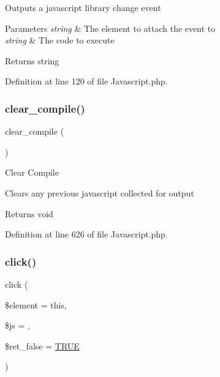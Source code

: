 Outputs a javascript library change event


\begin{DoxyParams}{Parameters}
{\em string} & The element to attach the event to \\
\hline
{\em string} & The code to execute \\
\hline
\end{DoxyParams}
\begin{DoxyReturn}{Returns}
string 
\end{DoxyReturn}


Definition at line 120 of file Javascript.\+php.

\mbox{\label{class_c_i___javascript_a4e3a7e7ffc20e8f578a0d66f52def10d}} 
\subsubsection{\texorpdfstring{clear\_compile()}{clear\_compile()}}
{\footnotesize\ttfamily clear\+\_\+compile (\begin{DoxyParamCaption}{ }\end{DoxyParamCaption})}

Clear Compile

Clears any previous javascript collected for output

\begin{DoxyReturn}{Returns}
void 
\end{DoxyReturn}


Definition at line 626 of file Javascript.\+php.

\mbox{\label{class_c_i___javascript_a508491310edc8bcb766f0adc89ec24c4}} 
\subsubsection{\texorpdfstring{click()}{click()}}
{\footnotesize\ttfamily click (\begin{DoxyParamCaption}\item[{}]{\$element = {\ttfamily \textquotesingle{}this\textquotesingle{}},  }\item[{}]{\$js = {\ttfamily \textquotesingle{}\textquotesingle{}},  }\item[{}]{\$ret\+\_\+false = {\ttfamily \mbox{\hyperlink{constants_8php_ae04a3efe6aa42044f803ee90c2277846}{T\+R\+UE}}} }\end{DoxyParamCaption})}

